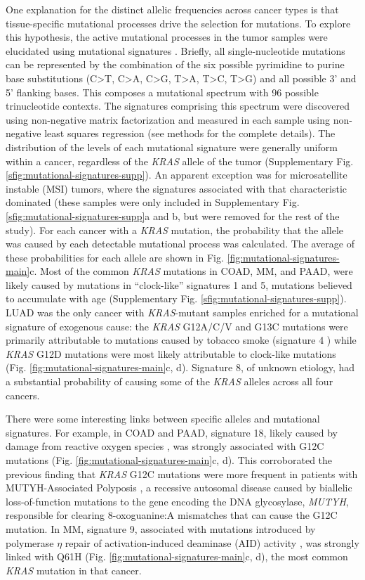 \documentclass[english, 10pt, letterpaper]{article}
\newcommand{\KRAS}{\emph{KRAS}}
\begin{document}
One explanation for the distinct allelic frequencies across cancer types is that tissue-specific mutational processes drive the selection for mutations.
To explore this hypothesis, the active mutational processes in the tumor samples were elucidated using mutational signatures \cite{Alexandrov2013}. 
Briefly, all single-nucleotide mutations can be represented by the combination of the six possible pyrimidine to purine base substitutions (C>T, C>A, C>G, T>A, T>C, T>G) and all possible 3’ and 5’ flanking bases. 
This composes a mutational spectrum with 96 possible trinucleotide contexts. 
The signatures comprising this spectrum were discovered using non-negative matrix factorization and measured in each sample using non-negative least squares regression (see methods for the complete details). 
The distribution of the levels of each mutational signature were generally uniform within a cancer, regardless of the \KRAS{} allele of the tumor (Supplementary Fig. \ref{sfig:mutational-signatures-supp}). 
An apparent exception was for microsatellite instable (MSI) tumors, where the signatures associated with that characteristic dominated (these samples were only included in Supplementary Fig. \ref{sfig:mutational-signatures-supp}a and b, but were removed for the rest of the study). 
For each cancer with a \KRAS{} mutation, the probability that the allele was caused by each detectable mutational process was calculated. 
The average of these probabilities for each allele are shown in Fig. \ref{fig:mutational-signatures-main}c. 
Most of the common \KRAS{} mutations in COAD, MM, and PAAD, were likely caused by mutations in “clock-like” signatures 1 and 5, mutations believed to accumulate with age \cite{Alexandrov2015} (Supplementary Fig. \ref{sfig:mutational-signatures-supp}). 
LUAD was the only cancer with \KRAS{}-mutant samples enriched for a mutational signature of exogenous cause: the \KRAS{} G12A/C/V and G13C mutations were primarily attributable to mutations caused by tobacco smoke (signature 4 \cite{Alexandrov2016}) while \KRAS{} G12D mutations were most likely attributable to clock-like mutations (Fig. \ref{fig:mutational-signatures-main}c, d).
Signature 8, of unknown etiology, had a substantial probability of causing some of the \KRAS{} alleles across all four cancers.

There were some interesting links between specific alleles and mutational signatures.
For example, in COAD and PAAD, signature 18, likely caused by damage from reactive oxygen species \cite{Viel2017, Pilati2017}, was strongly associated with G12C mutations (Fig. \ref{fig:mutational-signatures-main}c, d).
This corroborated the previous finding that \KRAS{} G12C mutations were more frequent in patients with MUTYH-Associated Polyposis \cite{Viel2017}, a recessive autosomal disease caused by biallelic loss-of-function mutations to the gene encoding the DNA glycosylase, \emph{MUTYH}, responsible for clearing 8-oxoguanine:A mismatches that can cause the G12C mutation.
In MM, signature 9, associated with mutations introduced by polymerase $\eta$ repair of activation-induced deaminase (AID) activity \cite{Alexandrov2013, Rogozin2018DNACancer., Petljak2016UnderstandingCancer.}, was strongly linked with Q61H (Fig. \ref{fig:mutational-signatures-main}c, d), the most common \KRAS{} mutation in that cancer.
\end{document}
